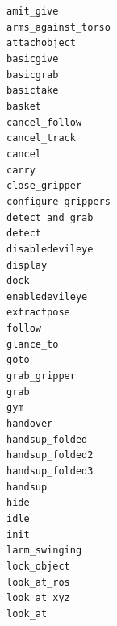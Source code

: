 \documentclass[handout,compress]{beamer}
\begin{document}
{
\begin{frame}{}
    \begin{multicols}{4}
\scriptsize

{\tt amit\_give} \\
{\tt arms\_against\_torso} \\
{\tt attachobject} \\
{\tt basicgive} \\
{\tt basicgrab} \\
{\tt basictake} \\
{\tt basket} \\
{\tt cancel\_follow} \\
{\tt cancel\_track} \\
{\tt cancel} \\
{\tt carry} \\
{\tt close\_gripper} \\
{\tt configure\_grippers} \\
{\tt detect\_and\_grab} \\
{\tt detect} \\
{\tt disabledevileye} \\
{\tt display} \\
{\tt dock} \\
{\tt enabledevileye} \\
{\tt extractpose} \\
{\tt follow} \\
{\tt glance\_to} \\
{\tt goto} \\
{\tt grab\_gripper} \\
{\tt grab} \\
{\tt gym} \\
{\tt handover} \\
{\tt handsup\_folded} \\
{\tt handsup\_folded2} \\
{\tt handsup\_folded3} \\
{\tt handsup} \\
{\tt hide} \\
{\tt idle} \\
{\tt init} \\
{\tt larm\_swinging} \\
{\tt lock\_object} \\
{\tt look\_at\_ros} \\
{\tt look\_at\_xyz} \\
{\tt look\_at} \\

\end{multicols}
\end{frame}}
\end{document}
